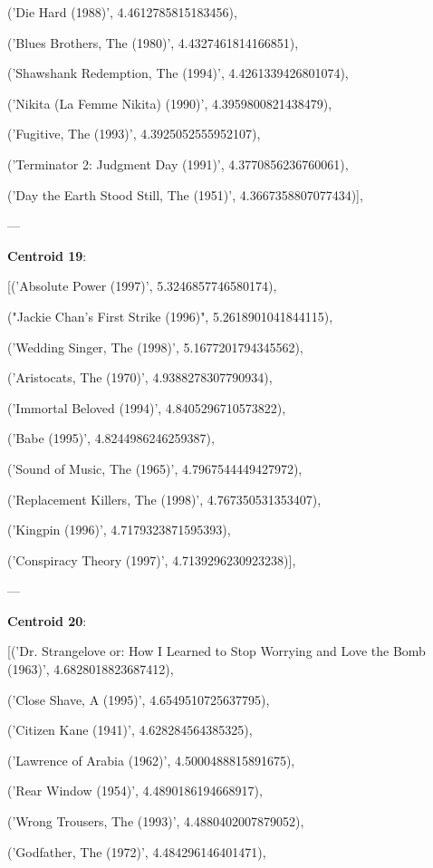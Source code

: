 \documentclass[11pt]{article}
\begin{document}
     ('Die Hard (1988)', 4.4612785815183456),
 
     ('Blues Brothers, The (1980)', 4.4327461814166851),
 
     ('Shawshank Redemption, The (1994)', 4.4261339426801074),
 
     ('Nikita (La Femme Nikita) (1990)', 4.3959800821438479),
 
     ('Fugitive, The (1993)', 4.3925052555952107),
 
     ('Terminator 2: Judgment Day (1991)', 4.3770856236760061),
 
     ('Day the Earth Stood Still, The (1951)', 4.3667358807077434)],
     
     ---
     
\textbf{Centroid 19}:
 
 [('Absolute Power (1997)', 5.3246857746580174),
 
      ("Jackie Chan's First Strike (1996)", 5.2618901041844115),
 
      ('Wedding Singer, The (1998)', 5.1677201794345562),
 
      ('Aristocats, The (1970)', 4.9388278307790934),
 
      ('Immortal Beloved (1994)', 4.8405296710573822),
 
      ('Babe (1995)', 4.8244986246259387),
 
      ('Sound of Music, The (1965)', 4.7967544449427972),
 
      ('Replacement Killers, The (1998)', 4.767350531353407),
 
      ('Kingpin (1996)', 4.7179323871595393),
 
      ('Conspiracy Theory (1997)', 4.7139296230923238)],
      
      ---
      
\textbf{Centroid 20}:
 
 [('Dr. Strangelove or: How I Learned to Stop Worrying and Love the Bomb (1963)', 4.6828018823687412),
 
      ('Close Shave, A (1995)', 4.6549510725637795),
 
      ('Citizen Kane (1941)', 4.628284564385325),
 
      ('Lawrence of Arabia (1962)', 4.5000488815891675),
 
      ('Rear Window (1954)', 4.4890186194668917),
 
      ('Wrong Trousers, The (1993)', 4.4880402007879052),
 
      ('Godfather, The (1972)', 4.484296146401471),
 
\end{document}
